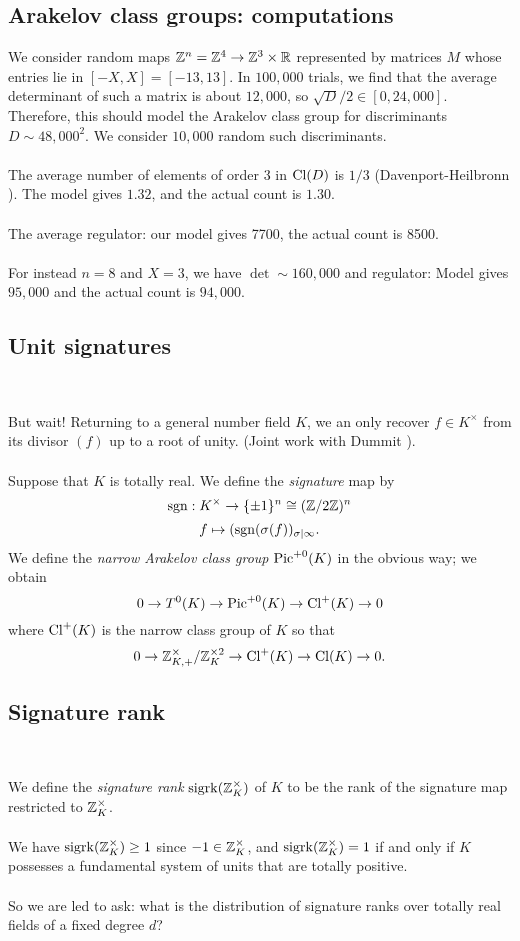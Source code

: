 \documentclass[12pt,amsfont]{amsart}
\begin{document}
\subsection{Arakelov class groups: computations}
We consider random maps ${\mathbb Z}^n = {\mathbb Z}^4 \rightarrow {\mathbb Z}^3 \times {\mathbb R}$ represented by matrices $M$ whose entries lie in $[-X, X] = [-13, 13]$. In $100,000$ trials, we find that the average determinant of such a matrix is about $12,000$, so $\sqrt{D}/2 \in [0, 24,000]$. Therefore, this should model the Arakelov class group for discriminants $D \sim 48,000^2$. We consider $10,000$ random such discriminants. \\ \\
The average number of elements of order 3 in $\operatorname{Cl}(D)$ is $1/3$ (Davenport-Heilbronn ). The model gives $1.32$, and the actual count is $1.30$. \\ \\
The average regulator: our model gives 7700, the actual count is 8500. \\ \\
For instead $n = 8$ and $X = 3$, we have $\det \sim 160,000$ and regulator: Model gives $95,000$ and the actual count is $94,000$. 


\subsection{Unit signatures}
{\ }

But wait! Returning to a general number field $K$, we an only recover $f \in K^\times$ from its divisor $(f)$ up to a root of unity. (Joint work with Dummit ). \\ \\
Suppose that $K$ is totally real. We define the \emph{signature} map by
\[\operatorname{sgn}: K^\times \rightarrow \{\pm 1\}^n \cong ({\mathbb Z} / 2{\mathbb Z})^n \]
\[f \mapsto (\operatorname{sgn} (\sigma(f))_{\sigma | \infty}. \]
We define the \emph{narrow Arakelov class group} $\operatorname{Pic}^{+0}(K)$ in the obvious way; we obtain
\[0 \rightarrow T^0(K) \rightarrow \operatorname{Pic}^{+0}(K) \rightarrow \operatorname{Cl}^+(K) \rightarrow 0 \]
where $\operatorname{Cl}^+(K)$ is the narrow class group of $K$ so that 
\[0 \rightarrow {\mathbb Z}_{K,+}^\times / {\mathbb Z}_K^{\times 2} \rightarrow \operatorname{Cl}^+(K) \rightarrow \operatorname{Cl}(K) \rightarrow 0.\]


\subsection{Signature rank}
{\ }

\newcommand{\sigrk}{\operatorname{sigrk}}
We define the \emph{signature rank} $\sigrk(\bZ_K^\times)$ of $K$ to be the rank of the signature map restricted to ${\mathbb Z}_K^\times$. \\ \\
We have $\sigrk(\bZ_K^\times) \geq 1$ since $-1 \in {\mathbb Z}_K^\times$, and $\sigrk(\bZ_K^\times) = 1$ if and only if $K$ possesses a fundamental system of units that are totally positive. \\ \\
So we are led to ask: what is the distribution of signature ranks over totally real fields of a fixed degree $d$?
\end{document}
